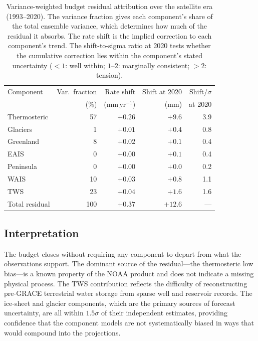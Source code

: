 \documentclass[11pt]{article}
\begin{document}
\begin{table}[h]
\centering
\caption{Variance-weighted budget residual attribution over the satellite era (1993--2020). The variance fraction gives each component's share of the total ensemble variance, which determines how much of the residual it absorbs. The rate shift is the implied correction to each component's trend. The shift-to-sigma ratio at 2020 tests whether the cumulative correction lies within the component's stated uncertainty ($<1$: well within; $1$--$2$: marginally consistent; $>2$: tension).}
\label{tab:budget_attribution}
\smallskip
\begin{tabular}{l r r r r}
\toprule
Component & Var.\ fraction & Rate shift & Shift at 2020 & Shift/$\sigma$ \\
          & (\%)           & (mm\,yr$^{-1}$) & (mm) & at 2020 \\
\midrule
Thermosteric  & 57 & $+0.26$ & $+9.6$  & 3.9 \\
Glaciers      &  1 & $+0.01$ & $+0.4$  & 0.8 \\
Greenland     &  8 & $+0.02$ & $+0.1$  & 0.4 \\
EAIS          &  0 & $+0.00$ & $+0.1$  & 0.4 \\
Peninsula     &  0 & $+0.00$ & $+0.0$  & 0.2 \\
WAIS          & 10 & $+0.03$ & $+0.8$  & 1.1 \\
TWS           & 23 & $+0.04$ & $+1.6$  & 1.6 \\
\midrule
Total residual & 100 & $+0.37$ & $+12.6$ & --- \\
\bottomrule
\end{tabular}
\end{table}

\subsection{Interpretation}

The budget closes without requiring any component to depart from what the observations support. The dominant source of the residual---the thermosteric low bias---is a known property of the NOAA product and does not indicate a missing physical process. The TWS contribution reflects the difficulty of reconstructing pre-GRACE terrestrial water storage from sparse well and reservoir records. The ice-sheet and glacier components, which are the primary sources of forecast uncertainty, are all within $1.5\sigma$ of their independent estimates, providing confidence that the component models are not systematically biased in ways that would compound into the projections.
\end{document}
